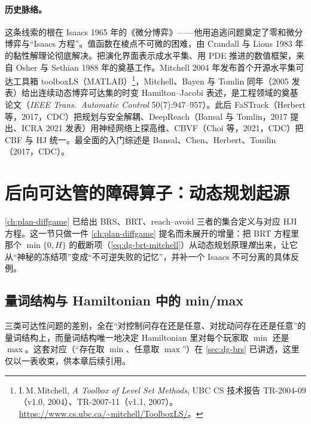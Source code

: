 \paragraph{历史脉络。}
这条线索的根在 Isaacs 1965 年的《微分博弈》——他用追逃问题奠定了零和微分博弈与“Isaacs 方程”\cite{isaacs1965differential}。值函数在棱点不可微的困难，由 Crandall 与 Lions 1983 年的黏性解理论彻底解决\cite{crandall1983viscosity}。把演化界面表示成水平集、用 PDE 推进的数值框架，来自 Osher 与 Sethian 1988 年的奠基工作\cite{osher1988fronts}。Mitchell 2004 年发布首个开源水平集可达工具箱 toolboxLS（MATLAB）\footnote{I.\,M.\,Mitchell, \emph{A Toolbox of Level Set Methods}, UBC CS 技术报告 TR-2004-09（v1.0, 2004）、TR-2007-11（v1.1, 2007）。\url{https://www.cs.ubc.ca/~mitchell/ToolboxLS/}。}，Mitchell、Bayen 与 Tomlin 同年（2005 发表）给出连续动态博弈可达集的时变 Hamilton--Jacobi 表述，是工程领域的奠基论文（\emph{IEEE Trans.\ Automatic Control} 50(7):947--957）\cite{mitchell2005time}。此后 FaSTrack（Herbert 等，2017，CDC）把规划与安全解耦\cite{herbert2017fastrack}、DeepReach（Bansal 与 Tomlin，2017 提出、ICRA 2021 发表）用神经网络上探高维\cite{bansal2021deepreach}、CBVF（Choi 等，2021，CDC）把 CBF 与 HJ 统一\cite{choi2021cbvf}。最全面的入门综述是 Bansal、Chen、Herbert、Tomlin（2017，CDC）\cite{bansal2017hamilton}。

\section{后向可达管的障碍算子：动态规划起源}
\label{sec:hj-brt-obstacle}

\cref{ch:plan-diffgame} 已给出 BRS、BRT、reach--avoid 三者的集合定义与对应 HJI 方程。这一节只做一件 \cref{ch:plan-diffgame} 提名而未展开的增量：把 BRT 方程里那个 $\min\{0,H\}$ 的截断项（\cref{eq:dg-brt-mitchell}）从动态规划原理\emph{推}出来，让它从“神秘的冻结项”变成“不可逆失败的记忆”，并补一个 Isaacs 不可分离的具体反例。

\subsection{量词结构与 Hamiltonian 中的 min/max}
\label{sec:hj-quantifier}

三类可达性问题的差别，全在“对控制问存在还是任意、对扰动问存在还是任意”的量词结构上，而量词结构唯一地决定 Hamiltonian 里对每个玩家取 $\min$ 还是 $\max$。这套对应（“存在取 $\min$、任意取 $\max$”）在 \cref{sec:dg-brs} 已讲透，这里仅以一表收束，供本章后续引用。

